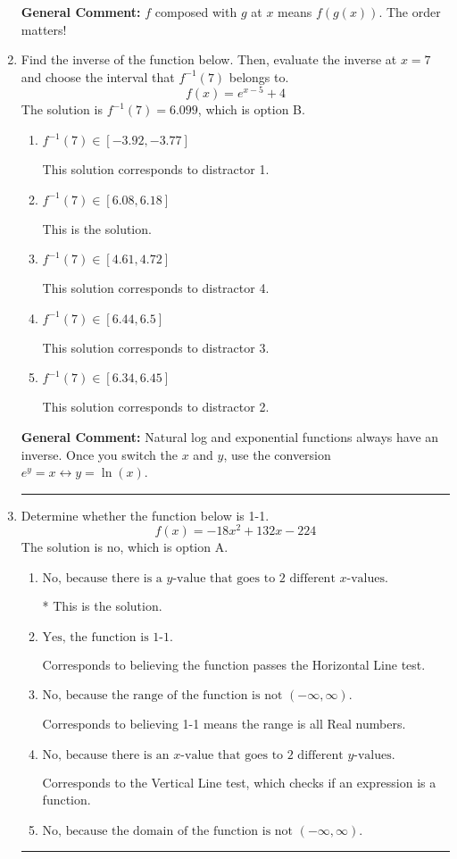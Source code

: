 \documentclass{extbook}[14pt]
\newcommand{\litem}[1]{\item #1

\rule{\textwidth}{0.4pt}}
\begin{document}
\begin{enumerate}
{\textbf{General Comment:} $f$ composed with $g$ at $x$ means $f(g(x))$. The order matters!
}
\litem{
Find the inverse of the function below. Then, evaluate the inverse at $x = 7$ and choose the interval that $f^{-1}(7)$ belongs to.
\[ f(x) = e^{x-5}+4 \]The solution is \( f^{-1}(7) = 6.099 \), which is option B.\begin{enumerate}[label=\Alph*.]
\item \( f^{-1}(7) \in [-3.92, -3.77] \)

 This solution corresponds to distractor 1.
\item \( f^{-1}(7) \in [6.08, 6.18] \)

 This is the solution.
\item \( f^{-1}(7) \in [4.61, 4.72] \)

 This solution corresponds to distractor 4.
\item \( f^{-1}(7) \in [6.44, 6.5] \)

 This solution corresponds to distractor 3.
\item \( f^{-1}(7) \in [6.34, 6.45] \)

 This solution corresponds to distractor 2.
\end{enumerate}

\textbf{General Comment:} Natural log and exponential functions always have an inverse. Once you switch the $x$ and $y$, use the conversion $ e^y = x \leftrightarrow y=\ln(x)$.
}
\litem{
Determine whether the function below is 1-1.
\[ f(x) = -18 x^2 + 132 x - 224 \]The solution is \( \text{no} \), which is option A.\begin{enumerate}[label=\Alph*.]
\item \( \text{No, because there is a $y$-value that goes to 2 different $x$-values.} \)

* This is the solution.
\item \( \text{Yes, the function is 1-1.} \)

Corresponds to believing the function passes the Horizontal Line test.
\item \( \text{No, because the range of the function is not $(-\infty, \infty)$.} \)

Corresponds to believing 1-1 means the range is all Real numbers.
\item \( \text{No, because there is an $x$-value that goes to 2 different $y$-values.} \)

Corresponds to the Vertical Line test, which checks if an expression is a function.
\item \( \text{No, because the domain of the function is not $(-\infty, \infty)$.} \)


\end{enumerate}}
\end{enumerate}
\end{document}

